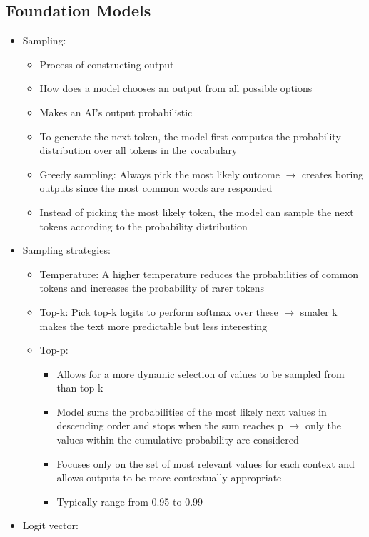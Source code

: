\documentclass[11pt]{scrartcl}
\begin{document}
\subsection*{Foundation Models}
\begin{itemize}
	\item Sampling: 
	\begin{itemize}
		\item Process of constructing output
		\item How does a model chooses an output from all possible options
		\item Makes an AI's output probabilistic
		\item To generate the next token, the model first computes the probability distribution over all tokens in the vocabulary
		\item Greedy sampling: Always pick the most likely outcome $\to$ creates boring outputs since the most common words are responded
		\item Instead of picking the most likely token, the model can sample the next tokens according to the probability distribution
	\end{itemize}
	\item Sampling strategies:
	\begin{itemize}
		\item Temperature: A higher temperature reduces the probabilities of common tokens and increases the probability of rarer tokens
		\item Top-k: Pick top-k logits to perform softmax over these $\to$ smaler k makes the text more predictable but less interesting
		\item Top-p: 
		\begin{itemize}
			\item Allows for a more dynamic selection of values to be sampled from than top-k
			\item Model sums the probabilities of the most likely next values in descending order and stops when the sum reaches p $\to$ only the values within the cumulative probability are considered
			\item Focuses only on the set of most relevant values for each context and allows outputs to be more contextually appropriate
			\item Typically range from 0.95 to 0.99
		\end{itemize}
	\end{itemize}
	\item Logit vector:
	\begin{itemize}

\end{itemize}
\end{itemize}
\end{document}
